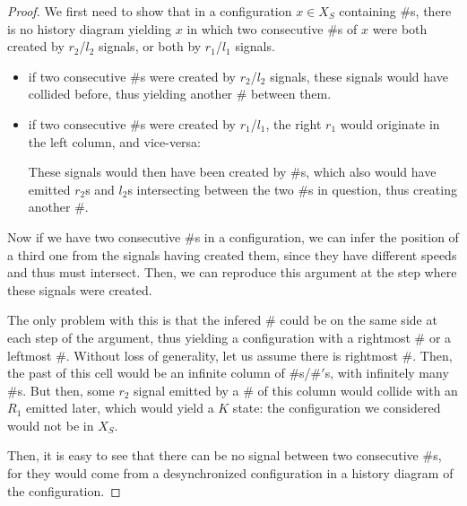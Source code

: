 \documentclass{jac}
\theoremstyle{definition}
\begin{document}
  \begin{proof}
    We first need to show that in a configuration $x\in X_S$ containing $\#$s,
    there is no history diagram yielding $x$ in which two consecutive $\#$s of $x$
    were both created by $r_2$/$l_2$ signals, or both by $r_1$/$l_1$ signals.
    \begin{itemize}
      \item if two consecutive $\#$s were created by $r_2$/$l_2$ signals, these
        signals would have collided before, thus yielding another $\#$ between
        them.
      \item if two consecutive $\#$s were created by $r_1$/$l_1$, the right $r_1$
        would originate in the left column, and vice-versa:
        \begin{center}
        \end{center}
        These signals would then have been created by $\#$s, which
        also would have emitted $r_2$s and $l_2$s intersecting between the two
        $\#$s in question, thus creating another $\#$.
    \end{itemize}

    Now if we have two consecutive $\#$s in a configuration, we can infer
    the position of a third one from the signals having created them, since they 
    have different speeds and thus must intersect. Then, we can reproduce this
    argument at the step where these signals were created.
    
    The only problem with this
    is that the infered $\#$ could be on the same side at each step of the argument,
    thus yielding a configuration with a rightmost $\#$ or a leftmost $\#$. Without
    loss of generality, let us assume there is rightmost $\#$. Then, the past of this cell
    would be an infinite column of $\#$s/$\#'$s, with infinitely many $\#$s. But then,
    some $r_2$ signal emitted by a $\#$ of this column would collide with an $R_1$ emitted
    later, which would yield a $K$ state: the configuration we considered would not be in
    $X_S$.

    
    Then, it is easy to see that there can be no signal between two consecutive $\#$s,
    for they would come from a desynchronized configuration in a history diagram of
    the configuration.
  \end{proof}
\end{document}
